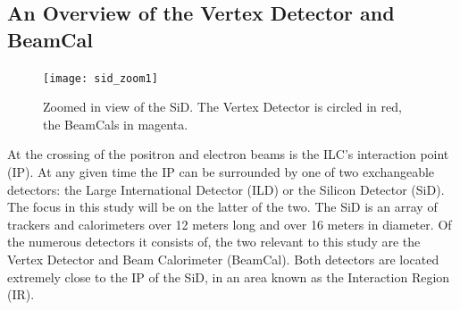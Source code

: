 \documentclass{report}
\begin{document}
            \subsection{An Overview of the Vertex Detector and BeamCal}
                \begin{figure}[h] 
                    \texttt{[image: sid\_zoom1]}
                    \centering
                    \caption{Zoomed in view of the SiD.
                        The Vertex Detector is circled in red,
                        the BeamCals in magenta.}
                    \label{fig:sid_zoom1}
                \end{figure}

                At the crossing of the positron and electron beams is the ILC's interaction point (IP). At any given time the IP can be surrounded by one of two exchangeable detectors: the Large International Detector (ILD) or the Silicon Detector (SiD). The focus in this study will be on the latter of the two. The SiD is an array of trackers and calorimeters over 12 meters long and over 16 meters in diameter. Of the numerous detectors it consists of, the two relevant to this study are the Vertex Detector and Beam Calorimeter (BeamCal). Both detectors are located extremely close to the IP of the SiD, in an area known as the Interaction Region (IR). 
                
\end{document}
